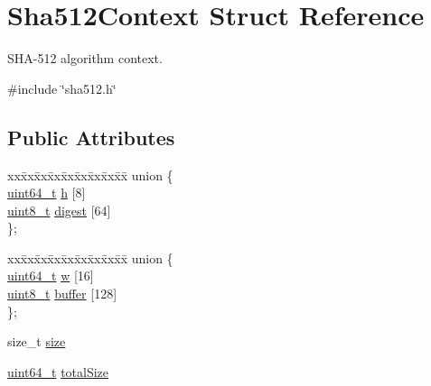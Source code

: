 \hypertarget{structSha512Context}{}\section{Sha512\+Context Struct Reference}
\label{structSha512Context}


S\+H\+A-\/512 algorithm context.  




{\ttfamily \#include \char`\"{}sha512.\+h\char`\"{}}

\subsection*{Public Attributes}
\begin{DoxyCompactItemize}
\item 
\begin{tabbing}
xx\=xx\=xx\=xx\=xx\=xx\=xx\=xx\=xx\=\kill
union \{\\
\>\hyperlink{stdint_8h_aec6fcb673ff035718c238c8c9d544c47}{uint64\_t} \hyperlink{structSha512Context_ad45c82baa9d7bc67dccdab829d8c2586}{h} \mbox{[}8\mbox{]}\\
\>\hyperlink{stdint_8h_aba7bc1797add20fe3efdf37ced1182c5}{uint8\_t} \hyperlink{structSha512Context_a132f046ba86d88873dd6a5b960e3bf8c}{digest} \mbox{[}64\mbox{]}\\
\}; \\

\end{tabbing}\item 
\begin{tabbing}
xx\=xx\=xx\=xx\=xx\=xx\=xx\=xx\=xx\=\kill
union \{\\
\>\hyperlink{stdint_8h_aec6fcb673ff035718c238c8c9d544c47}{uint64\_t} \hyperlink{structSha512Context_ae359d0bf9be744a30222e2086ca42860}{w} \mbox{[}16\mbox{]}\\
\>\hyperlink{stdint_8h_aba7bc1797add20fe3efdf37ced1182c5}{uint8\_t} \hyperlink{structSha512Context_a5634ba203a8da22b12ddd1dd74089f37}{buffer} \mbox{[}128\mbox{]}\\
\}; \\

\end{tabbing}\item 
size\+\_\+t \hyperlink{structSha512Context_ac9959286ecbbbe3fc89c954f65e3add2}{size}
\item 
\hyperlink{stdint_8h_aec6fcb673ff035718c238c8c9d544c47}{uint64\+\_\+t} \hyperlink{structSha512Context_a5fc83aae6c94e47daba93aa778cb952d}{total\+Size}
\end{DoxyCompactItemize}


